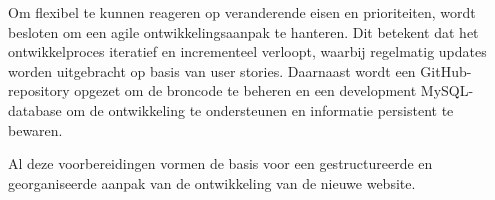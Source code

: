 Om flexibel te kunnen reageren op veranderende eisen en prioriteiten, wordt besloten om een agile ontwikkelingsaanpak te hanteren. Dit betekent dat het ontwikkelproces iteratief en incrementeel verloopt, waarbij regelmatig updates worden uitgebracht op basis van user stories. Daarnaast wordt een GitHub-repository opgezet om de broncode te beheren en een development MySQL-database om de ontwikkeling te ondersteunen en informatie persistent te bewaren.

Al deze voorbereidingen vormen de basis voor een gestructureerde en georganiseerde aanpak van de ontwikkeling van de nieuwe website.
